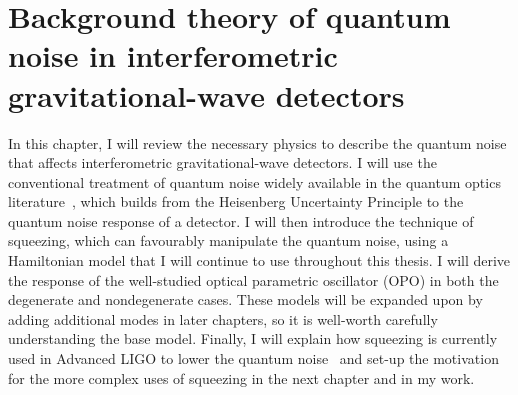 \chapter{Background theory of quantum noise in interferometric gravitational-wave detectors} %
\label{chp:background_theory}





In this chapter, I will review the necessary physics to describe the quantum noise that affects interferometric gravitational-wave detectors. I will use the conventional treatment of quantum noise widely available in the quantum optics literature~\cite{Danilishin,MiaoQCRB}, which builds from the Heisenberg Uncertainty Principle to the quantum noise response of a detector. 
I will then introduce the technique of squeezing, which can favourably manipulate the quantum noise, using a Hamiltonian model that I will continue to use throughout this thesis. I will derive the response of the well-studied optical parametric oscillator (OPO) in both the degenerate and nondegenerate cases. These models will be expanded upon by adding additional modes in later chapters, so it is well-worth carefully understanding the base model. Finally, I will explain how squeezing is currently used in Advanced LIGO to lower the quantum noise~\cite{} and set-up the motivation for the more complex uses of squeezing in the next chapter and in my work.


